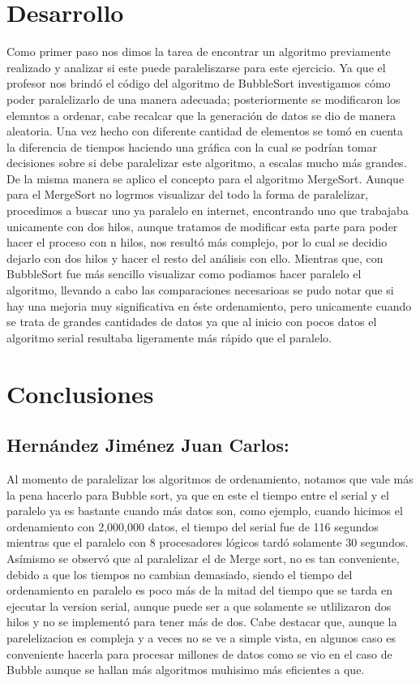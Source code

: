 \documentclass[11pt,letterpaper]{report}
\begin{document}
\section*{Desarrollo}
Como primer paso nos dimos la tarea de encontrar un algoritmo previamente realizado y analizar si este puede paraleliszarse para este ejercicio.
Ya que el profesor nos brind\' o el c\' odigo del algoritmo de BubbleSort investigamos c\' omo poder paralelizarlo de una manera adecuada; posteriormente se modificaron los elemntos a ordenar, cabe recalcar que la generaci\' on de datos se dio de manera aleatoria.
Una vez hecho con diferente cantidad de elementos se tom\' o en cuenta la diferencia de tiempos haciendo una gráfica con la cual se podrían tomar decisiones sobre si debe paralelizar este algoritmo, a escalas mucho más grandes.
De la misma manera se aplico el concepto para el algoritmo MergeSort.
Aunque para el MergeSort no logrmos visualizar del todo la forma de paralelizar, procedimos a buscar uno ya paralelo en internet, encontrando uno que trabajaba unicamente con dos hilos, aunque tratamos de modificar esta parte para poder hacer el proceso con n hilos, nos result\' o más complejo, por lo cual se decidio dejarlo con dos hilos y hacer el resto del análisis con ello.
Mientras que, con BubbleSort fue más sencillo visualizar como podiamos hacer paralelo el algoritmo, llevando a cabo las comparaciones necesarioas se pudo notar que si hay una mejoria muy significativa en éste ordenamiento, pero unicamente cuando se trata de grandes cantidades de datos ya que al inicio con pocos datos el algoritmo serial resultaba ligeramente más rápido que el paralelo.


\newpage
\section*{Conclusiones}
\subsection*{Hernández Jiménez Juan Carlos:}
Al momento de paralelizar los algoritmos de ordenamiento, notamos que vale más la pena hacerlo para Bubble sort, ya que en este el tiempo entre el serial y el paralelo ya es bastante cuando más datos son, como ejemplo, cuando hicimos el ordenamiento con 2,000,000 datos, el tiempo del serial fue de 116 segundos mientras que el paralelo con 8 procesadores l\' ogicos tard\' o solamente 30 segundos.
Asímismo se observ\' o que al paralelizar el de Merge sort, no es tan conveniente, debido a que los tiempos no cambian demasiado, siendo el tiempo del ordenamiento en paralelo es poco más de la mitad del tiempo que se tarda en ejecutar la version serial, aunque puede ser a que solamente se utlilizaron dos hilos y no se implement\' o para tener más de dos.
Cabe destacar que, aunque la parelelizacion es compleja y a veces no se ve a simple vista, en algunos caso es conveniente hacerla para procesar millones de datos como se vio en el caso de Bubble aunque se hallan más algoritmos muhisimo más eficientes a que.
\end{document}
